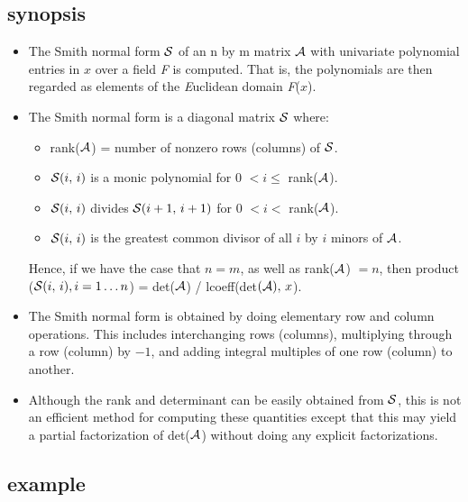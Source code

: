\subsection{synopsis}

\begin{itemize}
\item The Smith normal form ${\cal S}$ of an n by m matrix ${\cal A}$
with univariate polynomial entries in $x$ over a field {\it F} is
computed. That is, the polynomials are then regarded as elements of the
{\it E}uclidean domain {\it F}($x$).

\item The Smith normal form is a diagonal matrix ${\cal S}$ where:

  \begin{itemize}
  \item rank(${\cal A}$) = number of nonzero rows (columns) of
        ${\cal S}$.
  \item ${\cal S}(i,\, i)$ is a monic polynomial for 0 $< i \leq $
        rank(${\cal A}$).
  \item ${\cal S}(i,\, i)$ divides ${\cal S}(i+1,\, i+1)$ for 0 $< i
        <$ rank(${\cal A}$).
  \item ${\cal S}(i,\,i)$ is the greatest common divisor of all $i$ by
        $i$ minors of ${\cal A}$.
  \end{itemize}

      Hence, if we have the case that $n = m$, as well as
      rank(${\cal A}$) $= n$, then product (${\cal S}(i,\,i),
      i=1\ldots n$) = det(${\cal A}$) / lcoeff(det$({\cal A}), \, x$).

\item The Smith normal form is obtained by doing elementary row and
      column operations. This includes interchanging rows (columns),
      multiplying through a row (column) by $-1$, and adding integral
      multiples of one row (column) to another.

\item Although the rank and determinant can be easily obtained from
      ${\cal S}$, this is not an efficient method for computing these
      quantities except that this may yield a partial factorization of
      det(${\cal A}$) without doing any explicit factorizations.

\end{itemize}

\subsection{example}


